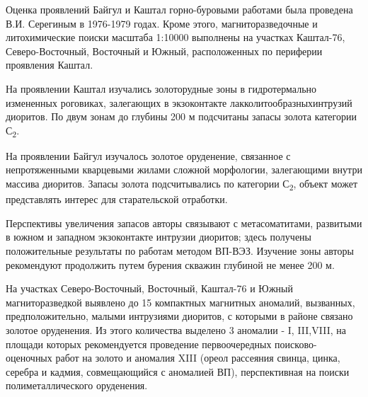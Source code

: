 % 

Оценка проявлений Байгул и Каштал горно-буровыми работами была проведена
В.И. Серегиным в 1976-1979 годах. Кроме этого, магниторазведочные и
литохимические поиски масштаба 1:10000 выполнены на участках Каштал-76,
Северо-Восточный, Восточный и Южный, расположенных по периферии
проявления Каштал.

На проявлении Каштал изучались золоторудные зоны в гидротермально
измененных роговиках, залегающих в экзоконтакте
лакколитообразныхинтрузий диоритов. По двум зонам до глубины 200 м
подсчитаны запасы золота категории С\textsubscript{2}.

На проявлении Байгул изучалось золотое оруденение, связанное с
непротяженными кварцевыми жилами сложной морфологии, залегающими внутри
массива диоритов. Запасы золота подсчитывались по категории
С\textsubscript{2}, объект может представлять интерес для старательской
отработки.

Перспективы увеличения запасов авторы связывают с метасоматитами,
развитыми в южном и западном экзоконтакте интрузии диоритов; здесь
получены положительные результаты по работам методом ВП-ВЭЗ. Изучение
зоны авторы рекомендуют продолжить путем бурения скважин глубиной не
менее 200 м.

На участках Северо-Восточный, Восточный, Каштал-76 и Южный
магниторазведкой выявлено до 15 компактных магнитных аномалий,
вызванных, предположительно, малыми интрузиями диоритов, с которыми в
районе связано золотое оруденения. Из этого количества выделено 3
аномалии - I, III,VIII, на площади которых рекомендуется проведение
первоочередных поисково-оценочных работ на золото и аномалия XIII (ореол
рассеяния свинца, цинка, серебра и кадмия, совмещающийся с аномалией
ВП), перспективная на поиски полиметаллического оруденения.

